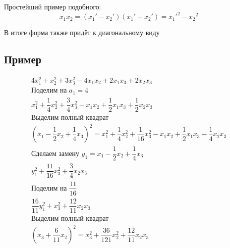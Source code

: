 \documentclass[12pt]{article}
\begin{document}
    Простейший пример подобного:
    \[
        x_1x_2 = (x_1' - x_2')(x_1' + x_2') = {x_1'}^2 - {x_2}^2
    \]

    В итоге форма также придёт к диагональному виду

    \subsection{Пример}
    \[
        \begin{array}{l}
            4x_1^2 + x_2^2 + 3x_3^2 - 4x_1x_2 + 2x_1x_3 + 2x_2x_3                                                                                           \\
            \text{Поделим на } a_1 = 4                                                                                                                      \\
            x_1^2 + \dfrac{1}{4}x_2^2 + \dfrac{3}{4}x_3^2 - x_1x_2 + \dfrac{1}{2}x_1x_3 + \dfrac{1}{2}x_2x_3                                                \\
            \text{Выделим полный квадрат}                                                                                                                   \\
            (x_1 - \dfrac{1}{2}x_2 + \dfrac{1}{4}x_3)^2 = x_1^2 + \dfrac{1}{4}x_2^2 + \dfrac{1}{16}x_3^2 - x_1x_2 + \dfrac{1}{2}x_1x_3 - \dfrac{1}{4}x_2x_3 \\
            \text{Сделаем замену } y_1 = x_1 - \dfrac{1}{2}x_2 + \dfrac{1}{4}x_3                                                                            \\
            y_1^2 + \dfrac{11}{16}x_3^2 + \dfrac{3}{4}x_2x_3                                                                                                \\
            \text{Поделим на } \dfrac{11}{16}                                                                                                               \\
            \dfrac{16}{11}y_1^2 + x_3^2 + \dfrac{12}{11}x_2x_3                                                                                              \\
            \text{Выделим полный квадрат}                                                                                                                   \\
            (x_3 + \dfrac{6}{11}x_2)^2 = x_3^2 + \dfrac{36}{121}x_2^2 + \dfrac{12}{11}x_2x_3                                                                \\

\end{array}\]
\end{document}
